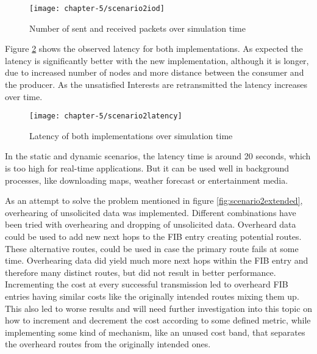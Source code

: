 \clearpage

\begin{figure}[H]
  \centering
  \texttt{[image: chapter-5/scenario2iod]}
  \caption{Number of sent and received packets over simulation time}
  \label{fig:scenario2iod}
\end{figure}

\vspace{5mm} %

Figure \ref{fig:scenario2latency} shows the observed latency for both implementations. As expected the latency is significantly better with the new implementation, although it is longer, due to increased number of nodes and more distance between the consumer and the producer. As the unsatisfied Interests are retransmitted the latency increases over time.

\vspace{5mm} %

\begin{figure}[H]
  \centering
  \texttt{[image: chapter-5/scenario2latency]}
  \caption{Latency of both implementations over simulation time}
  \label{fig:scenario2latency}
\end{figure}

\vspace{5mm} %

In the static and dynamic scenarios, the latency time is around 20 seconds, which is too high for real-time applications. But it can be used well in background processes, like downloading maps, weather forecast or entertainment media.

As an attempt to solve the problem mentioned in figure \ref{fig:scenario2extended}, overhearing of unsolicited data was implemented. Different combinations have been tried with overhearing and dropping of unsolicited data. Overheard data could be used to add new next hops to the FIB entry creating potential routes. These alternative routes, could be used in case the primary route fails at some time. Overhearing data did yield much more next hops within the FIB entry and therefore many distinct routes, but did not result in better performance. Incrementing the cost at every successful transmission led to overheard FIB entries having similar costs like the originally intended routes mixing them up. This also led to worse results and will need further investigation into this topic on how to increment and decrement the cost according to some defined metric, while implementing some kind of mechanism, like an unused cost band, that separates the overheard routes from the originally intended ones.


